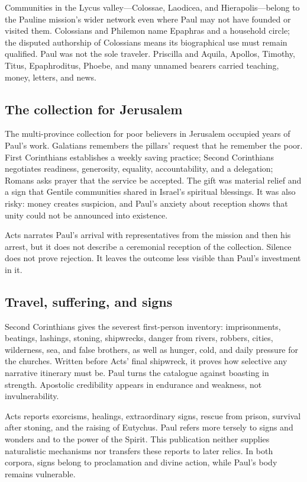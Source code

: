 Communities in the Lycus valley---Colossae, Laodicea, and Hierapolis---belong
to the Pauline mission's wider network even where Paul may not have founded or
visited them. Colossians and Philemon name Epaphras and a household circle;
the disputed authorship of Colossians means its biographical use must remain
qualified. Paul was not the sole traveler. Priscilla and Aquila, Apollos,
Timothy, Titus, Epaphroditus, Phoebe, and many unnamed bearers carried
teaching, money, letters, and news.

\subsection{The collection for Jerusalem}

The multi-province collection for poor believers in Jerusalem occupied years
of Paul's work. Galatians remembers the pillars' request that he remember the
poor. First Corinthians establishes a weekly saving practice; Second
Corinthians negotiates readiness, generosity, equality, accountability, and a
delegation; Romans asks prayer that the service be accepted. The gift was
material relief and a sign that Gentile communities shared in Israel's
spiritual blessings. It was also risky: money creates suspicion, and Paul's
anxiety about reception shows that unity could not be announced into existence.

Acts narrates Paul's arrival with representatives from the mission and then
his arrest, but it does not describe a ceremonial reception of the collection.
Silence does not prove rejection. It leaves the outcome less visible than
Paul's investment in it.

\subsection{Travel, suffering, and signs}

Second Corinthians gives the severest first-person inventory: imprisonments,
beatings, lashings, stoning, shipwrecks, danger from rivers, robbers, cities,
wilderness, sea, and false brothers, as well as hunger, cold, and daily
pressure for the churches. Written before Acts' final shipwreck, it proves how
selective any narrative itinerary must be. Paul turns the catalogue against
boasting in strength. Apostolic credibility appears in endurance and weakness,
not invulnerability.

Acts reports exorcisms, healings, extraordinary signs, rescue from prison,
survival after stoning, and the raising of Eutychus. Paul refers more tersely
to signs and wonders and to the power of the Spirit. This publication neither
supplies naturalistic mechanisms nor transfers these reports to later relics.
In both corpora, signs belong to proclamation and divine action, while Paul's
body remains vulnerable.

